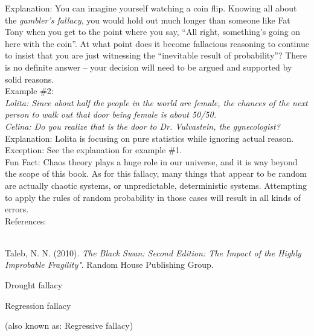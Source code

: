 \documentclass[a4paper,12pt,single,pdftex]{scrbook}
\begin{document}
    
      Explanation: You can imagine yourself watching a coin flip.  Knowing all about the {\it gambler’s fallacy}, you would hold out much longer than someone like Fat Tony when you get to the point where you say, “All right, something’s going on here with the coin”.  At what point does it become fallacious reasoning to continue to insist that you are just witnessing the “inevitable result of probability”?  There is no definite answer -- your decision will need to be argued and supported by solid reasons.
    \\

    
      Example \#2:
    \\

    
      {\em Lolita: Since about half the people in the world are female, the chances of the next person to walk out that door being female is about 50/50.}
    \\

    
      {\em Celina: Do you realize that is the door to Dr. Vulvastein, the gynecologist?}
    \\

    
      Explanation: Lolita is focusing on pure statistics while ignoring actual reason.
    \\

    
      Exception: See the explanation for example \#1.
    \\

    
      Fun Fact:  Chaos theory plays a huge role in our universe, and it is way beyond the scope of this book.  As for this fallacy, many things that appear to be random are actually chaotic systems, or unpredictable, deterministic systems.  Attempting to apply the rules of random probability in those cases will result in all kinds of errors.
    \\

    References:

    
      
        
      \\

      
        
          Taleb, N. N. (2010). {\it The Black Swan: Second Edition: The Impact of the Highly Improbable Fragility"}. Random House Publishing Group.
        
      
    
  

Drought fallacy

Regression fallacy
    
      (also known as: Regressive fallacy)
    \\
\end{document}
